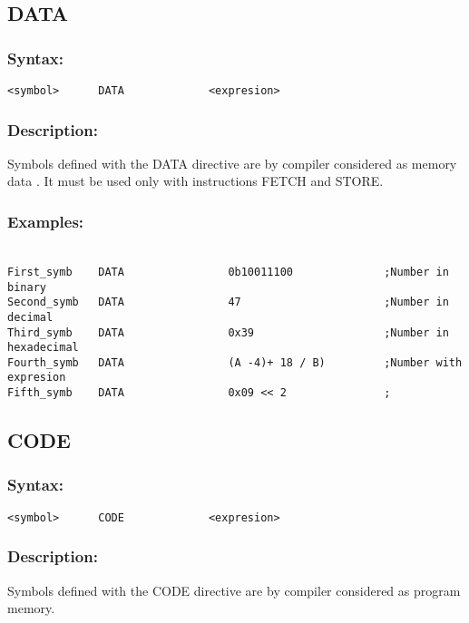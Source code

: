 {    \subsection{DATA}
        \subsubsection{Syntax:}
            \verb'<symbol>      DATA             <expresion>'
            
        \subsubsection{Description:}
            Symbols defined with the DATA directive are by compiler considered as memory data . It must be used only with instructions FETCH and STORE.

        \subsubsection{Examples:}
            {
                ~\\
                \usecodefont
                \verb'First_symb    DATA                0b10011100              ;Number in binary'\\
                \verb'Second_symb   DATA                47                      ;Number in decimal'\\
                \verb'Third_symb    DATA                0x39                    ;Number in hexadecimal'\\
                \verb'Fourth_symb   DATA                (A -4)+ 18 / B)         ;Number with expresion'\\
                \verb'Fifth_symb    DATA                0x09 << 2               ;'\\
            }
            
    \subsection{CODE}
        \subsubsection{Syntax:}
            \verb'<symbol>      CODE             <expresion>'
        \subsubsection{Description:}
        Symbols defined with the CODE directive are by compiler considered as program memory.

}
